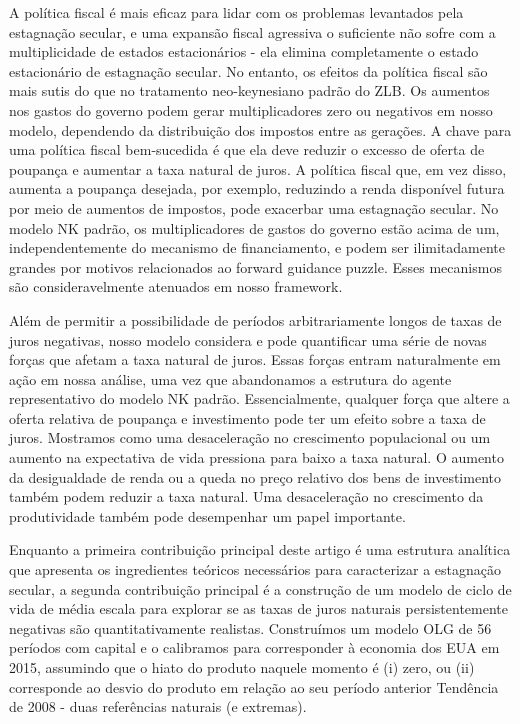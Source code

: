 A política fiscal é mais eficaz para lidar com os problemas levantados pela estagnação secular, e uma expansão fiscal agressiva o suficiente não sofre com a multiplicidade de estados estacionários - ela elimina completamente o estado estacionário de estagnação secular. No entanto, os efeitos da política fiscal são mais sutis do que no tratamento neo-keynesiano padrão do ZLB. Os aumentos nos gastos do governo podem gerar multiplicadores zero ou negativos em nosso modelo, dependendo da distribuição dos impostos entre as gerações. A chave para uma política fiscal bem-sucedida é que ela deve reduzir o excesso de oferta de poupança e aumentar a taxa natural de juros. A política fiscal que, em vez disso, aumenta a poupança desejada, por exemplo, reduzindo a renda disponível futura por meio de aumentos de impostos, pode exacerbar uma estagnação secular. No modelo NK padrão, os multiplicadores de gastos do governo estão acima de um, independentemente do mecanismo de financiamento, e podem ser ilimitadamente grandes por motivos relacionados ao  forward guidance puzzle. Esses mecanismos são consideravelmente atenuados em nosso framework.

Além de permitir a possibilidade de períodos arbitrariamente longos de taxas de juros negativas, nosso modelo considera e pode quantificar uma série de novas forças que afetam a taxa natural de juros. Essas forças entram naturalmente em ação em nossa análise, uma vez que abandonamos a estrutura do agente representativo do modelo NK padrão. Essencialmente, qualquer força que altere a oferta relativa de poupança e investimento pode ter um efeito sobre a taxa de juros. Mostramos como uma desaceleração no crescimento populacional ou um aumento na expectativa de vida pressiona para baixo a taxa natural. O aumento da desigualdade de renda ou a queda no preço relativo dos bens de investimento também podem reduzir a taxa natural. Uma desaceleração no crescimento da produtividade também pode desempenhar um papel importante.

Enquanto a primeira contribuição principal deste artigo é uma estrutura analítica que apresenta os ingredientes teóricos necessários para caracterizar a estagnação secular, a segunda contribuição principal é a construção de um modelo de ciclo de vida de média escala para explorar se as taxas de juros naturais persistentemente negativas são quantitativamente realistas. Construímos um modelo OLG de 56 períodos com capital e o calibramos para corresponder à economia dos EUA em 2015, assumindo que o hiato do produto naquele momento é (i) zero, ou (ii) corresponde ao desvio do produto em relação ao seu período anterior Tendência de 2008 - duas referências naturais (e extremas).

